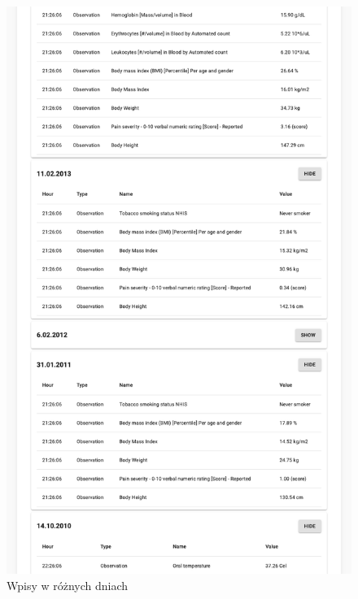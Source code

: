 \documentclass[polish,polish,a4paper]{article}
\begin{document}
	\begin{figure}[!h]
		\centering
		\includegraphics[width=.8\linewidth]{img/patient4.png}
		\caption{Wpisy w różnych dniach}
	\end{figure}
\end{document}
